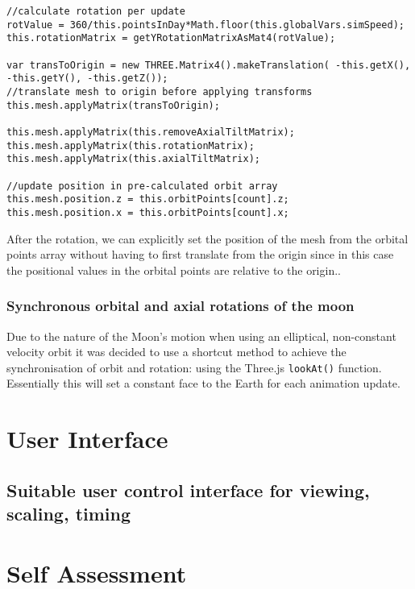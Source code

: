 \documentclass[titlepage]{article}
\begin{document}
\begin{lstlisting}[caption=Code taken from Earth.js]
//calculate rotation per update
rotValue = 360/this.pointsInDay*Math.floor(this.globalVars.simSpeed);
this.rotationMatrix = getYRotationMatrixAsMat4(rotValue);

var transToOrigin = new THREE.Matrix4().makeTranslation( -this.getX(), -this.getY(), -this.getZ());
//translate mesh to origin before applying transforms
this.mesh.applyMatrix(transToOrigin);

this.mesh.applyMatrix(this.removeAxialTiltMatrix);
this.mesh.applyMatrix(this.rotationMatrix);
this.mesh.applyMatrix(this.axialTiltMatrix);

//update position in pre-calculated orbit array
this.mesh.position.z = this.orbitPoints[count].z;
this.mesh.position.x = this.orbitPoints[count].x;

\end{lstlisting}

After the rotation, we can explicitly set the position of the mesh from the orbital points array without having to first translate from the origin since in this case the positional values in the orbital points are relative to the origin..

\subsubsection{Synchronous orbital and axial rotations of the moon}

Due to the nature of the Moon's motion when using an elliptical, non-constant velocity orbit it was decided to use a shortcut method to achieve the synchronisation of orbit and rotation: using the Three.js \texttt{lookAt()} function. Essentially this will set a constant face to the Earth for each animation update.

\section{User Interface}
\subsection{Suitable user control interface for viewing, scaling, timing}
\section{Self Assessment}
\end{document}
